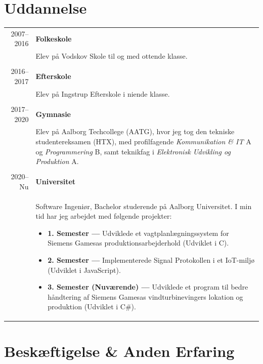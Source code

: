 \documentclass{article}
\begin{document}
    \section*{Uddannelse}
    \begin{tabular}{p{}|p{}} 
    \multicolumn{1}{r|}{2007--2016} & \textbf{Folkeskole}\\
    &   Elev på Vodskov Skole til og med ottende klasse.
        \\\\
    \multicolumn{1}{r|}{2016--2017} & \textbf{Efterskole}\\
    &   Elev på Ingstrup Efterskole i niende klasse.
        \\\\
    \multicolumn{1}{r|}{2017--2020} & \textbf{Gymnasie}\\
    &   Elev på Aalborg Techcollege (AATG), hvor jeg tog den tekniske studentereksamen (HTX),
        med profilfagende \textit{Kommunikation \& IT} A og \textit{Programmering} B, samt teknikfag i \textit{Elektronisk Udvikling og Produktion} A.
        \\\\
    \multicolumn{1}{r|}{2020--Nu} & \textbf{Universitet}\\
    &   Software Ingeniør, Bachelor studerende på Aalborg Universitet. I min tid har jeg arbejdet
        med følgende projekter:
        \begin{itemize}
            \item[] \textbf{1. Semester --- } Udviklede et vagtplanlægningssystem for Siemens Gamesas
                produktionsarbejderhold (Udviklet i C).
            \item[] \textbf{2. Semester --- } Implementerede Signal Protokollen i et IoT-miljø
                (Udviklet i JavaScript).
            \item[] \textbf{3. Semester (Nuværende) --- } Udviklede et program til bedre håndtering
                af Siemens Gamesas vindturbinevingers lokation og produktion (Udviklet i C\#).
        \end{itemize}
    \end{tabular}
 
    \section*{Beskæftigelse \& Anden Erfaring}
\end{document}
